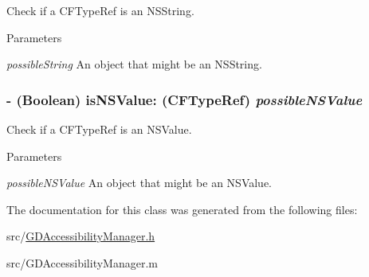 Check if a CFTypeRef is an NSString. 
\begin{DoxyParams}{Parameters}
\item[{\em possibleString}]An object that might be an NSString. \end{DoxyParams}
\hypertarget{interface_g_d_accessibility_manager_acdce820e06d533b51a1eaec8618019c1}{
\subsubsection[{isNSValue:}]{\setlength{\rightskip}{0pt plus 5cm}-\/ (Boolean) isNSValue: (CFTypeRef) {\em possibleNSValue}}}
\label{interface_g_d_accessibility_manager_acdce820e06d533b51a1eaec8618019c1}


Check if a CFTypeRef is an NSValue. 
\begin{DoxyParams}{Parameters}
\item[{\em possibleNSValue}]An object that might be an NSValue. \end{DoxyParams}


The documentation for this class was generated from the following files:\begin{DoxyCompactItemize}
\item 
src/\hyperlink{_g_d_accessibility_manager_8h}{GDAccessibilityManager.h}\item 
src/GDAccessibilityManager.m\end{DoxyCompactItemize}
